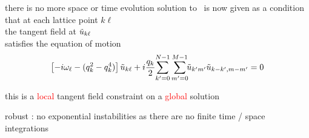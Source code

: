 \begin{frame}{there is no more space or time evolution}
solution to \KS\ is now given as
a condition that at each lattice point $k\ell$ \\
the tangent field at $\tilde{u}_{k\ell}$ \\
satisfies the equation of motion
\[
\left[- i \omega_\ell - ( q_k^2 - q_k^4 ) \right]\tilde{u}_{k\ell}
+ i \frac{q_k}{2} \!\sum_{k'=0}^{N-1} \sum^{M-1}_{m'=0}\!\!
\tilde{u}_{k'm'} \tilde{u}_{k-k',m-m'}
    =
0
\]

\bigskip

this is a \textcolor{red}{local} tangent field constraint on a \textcolor{red}{global} solution

\bigskip

robust : no exponential instabilities as there are no finite time / space integrations

\end{frame}

%
%
%
%
%


